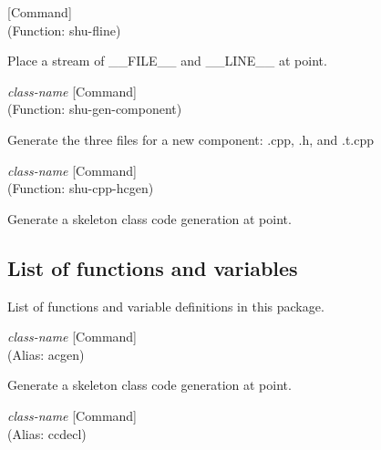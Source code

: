 \vspace{1em}
\noindent
{}
\usebox{\funcname}
 \hfill [Command]\\%
 (Function: shu-fline)

\begin{doc-string}
Place a stream of \_\_FILE\_\_ and \_\_LINE\_\_ at point.
\end{doc-string}

\vspace{1em}
\noindent
{}
\usebox{\funcname}\emph{class-name}
 \hfill [Command]\\%
 (Function: shu-gen-component)

\begin{doc-string}
Generate the three files for a new component: .cpp, .h, and .t.cpp
\end{doc-string}

\vspace{1em}
\noindent
{}
\usebox{\funcname}\emph{class-name}
 \hfill [Command]\\%
 (Function: shu-cpp-hcgen)

\begin{doc-string}
Generate a skeleton class code generation at point.
\end{doc-string}

\subsection{List of functions and variables}

List of functions and variable definitions in this package.



\vspace{1em}
\noindent
{}
\usebox{\funcname}\emph{class-name}
 \hfill [Command]\\%
 (Alias: acgen)

\begin{doc-string}
Generate a skeleton class code generation at point.
\end{doc-string}

\vspace{1em}
\noindent
{}
\usebox{\funcname}\emph{class-name}
 \hfill [Command]\\%
 (Alias: ccdecl)

